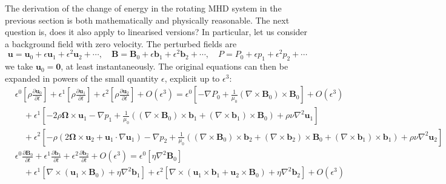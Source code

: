 The derivation of the change of energy in the rotating MHD system in the previous section is both mathematically and physically reasonable.
The next question is, does it also apply to linearised versions?
In particular, let us consider a background field with zero velocity. The perturbed fields are
%
\begin{equation}
    \mathbf{u} = \mathbf{u}_0 + \epsilon \mathbf{u}_1 + \epsilon^2 \mathbf{u}_2 + \cdots, \quad 
    \mathbf{B} = \mathbf{B}_0 + \epsilon \mathbf{b}_1 + \epsilon^2 \mathbf{b}_2 + \cdots, \quad 
    P = P_0 + \epsilon p_1 + \epsilon^2 p_2 + \cdots
\end{equation}
%
we take $\mathbf{u}_0 = \mathbf{0}$, at least instantaneously.
The original equations can then be expanded in powers of the small quantity $\epsilon$, explicit up to $\epsilon^3$:
%
\begin{equation}\label{eqn:eqn-epsilon-expand}
\begin{aligned}    
    &\epsilon^0 \left[\rho \frac{\partial \mathbf{u}_0}{\partial t}\right] + \epsilon^1 \left[\rho \frac{\partial \mathbf{u}_1}{\partial t}\right] + \epsilon^2 \left[\rho \frac{\partial \mathbf{u}_2}{\partial t}\right] + O\left(\epsilon^3\right)
    = \epsilon^0 \left[- \nabla P_0 + \frac{1}{\mu_0} (\nabla\times \mathbf{B}_0)\times \mathbf{B}_0\right] + O\left(\epsilon^3\right)  \\
    &\quad + \epsilon^1 \left[ - 2 \rho \boldsymbol{\Omega}\times \mathbf{u}_1 - \nabla p_1 + \frac{1}{\mu_0} \left((\nabla\times \mathbf{B}_0)\times \mathbf{b}_1 + (\nabla\times \mathbf{b}_1)\times \mathbf{B}_0\right) + \rho \nu \nabla^2 \mathbf{u}_1\right] \\
    &\quad + \epsilon^2 \left[ - \rho(2 \boldsymbol{\Omega}\times \mathbf{u}_2 + \mathbf{u}_1\cdot \nabla\mathbf{u}_1) - \nabla p_2 + \frac{1}{\mu_0} \left((\nabla\times \mathbf{B}_0)\times \mathbf{b}_2 + (\nabla\times \mathbf{b}_2)\times \mathbf{B}_0 + (\nabla\times \mathbf{b}_1)\times \mathbf{b}_1\right) + \rho \nu \nabla^2 \mathbf{u}_2\right] \\ 
    & \epsilon^0 \frac{\partial \mathbf{B}_0}{\partial t} + \epsilon^1 \frac{\partial \mathbf{b}_1}{\partial t} + \epsilon^2 \frac{\partial \mathbf{b}_2}{\partial t} + O\left(\epsilon^3\right) =
    \epsilon^0 \left[\eta \nabla^2 \mathbf{B}_0\right] \\
    &\quad + \epsilon^1 \left[\nabla\times (\mathbf{u}_1 \times \mathbf{B}_0) + \eta \nabla^2 \mathbf{b}_1\right] + \epsilon^2 \left[\nabla\times (\mathbf{u}_1\times \mathbf{b}_1 + \mathbf{u}_2\times \mathbf{B}_0) + \eta \nabla^2 \mathbf{b}_2\right] + O\left(\epsilon^3\right)
\end{aligned}
\end{equation}
